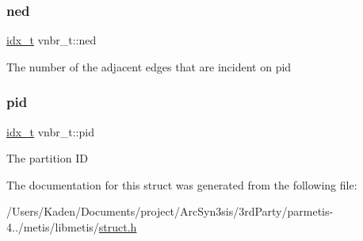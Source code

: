 \subsubsection{\texorpdfstring{ned}{ned}}
{\footnotesize\ttfamily \hyperlink{a00876_aaa5262be3e700770163401acb0150f52}{idx\+\_\+t} vnbr\+\_\+t\+::ned}

The number of the adjacent edges that are incident on pid \mbox{\label{a00722_a93adf79b4e57cd0477e9afc9b25da653}} 
\subsubsection{\texorpdfstring{pid}{pid}}
{\footnotesize\ttfamily \hyperlink{a00876_aaa5262be3e700770163401acb0150f52}{idx\+\_\+t} vnbr\+\_\+t\+::pid}

The partition ID 

The documentation for this struct was generated from the following file\+:\begin{DoxyCompactItemize}
\item 
/\+Users/\+Kaden/\+Documents/project/\+Arc\+Syn3sis/3rd\+Party/parmetis-\/4../metis/libmetis/\hyperlink{a00972}{struct.\+h}\end{DoxyCompactItemize}
